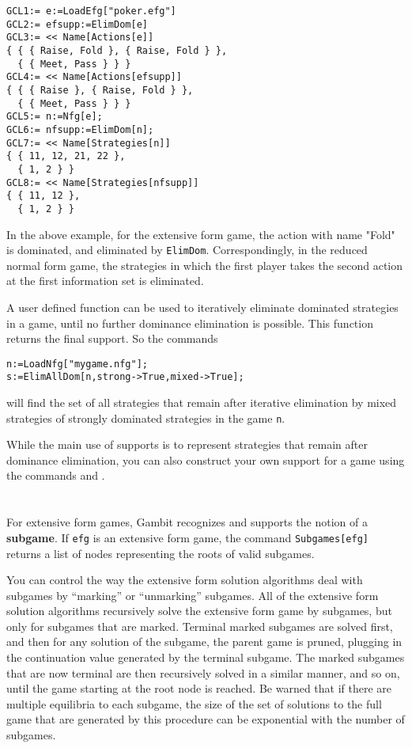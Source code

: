 \begin{verbatim}
GCL1:= e:=LoadEfg["poker.efg"]
GCL2:= efsupp:=ElimDom[e]
GCL3:= << Name[Actions[e]]
{ { { Raise, Fold }, { Raise, Fold } },
  { { Meet, Pass } } }
GCL4:= << Name[Actions[efsupp]]
{ { { Raise }, { Raise, Fold } },
  { { Meet, Pass } } }
GCL5:= n:=Nfg[e];
GCL6:= nfsupp:=ElimDom[n];
GCL7:= << Name[Strategies[n]]
{ { 11, 12, 21, 22 },
  { 1, 2 } }
GCL8:= << Name[Strategies[nfsupp]]
{ { 11, 12 },
  { 1, 2 } }
\end{verbatim}

In the above example, for the extensive form game, the action with
name "Fold" is dominated, and eliminated by \verb+ElimDom+.
Correspondingly, in the reduced normal form game, the strategies in
which the first player takes the second action at the first
information set is eliminated.  

A user defined function  can be used to iteratively
eliminate dominated strategies in a game, until no further dominance
elimination is possible.  This function returns the final support.  So
the commands

\begin{verbatim}
n:=LoadNfg["mygame.nfg"];
s:=ElimAllDom[n,strong->True,mixed->True];
\end{verbatim}

\noindent
will find the set of all strategies that remain after iterative
elimination by mixed strategies of strongly dominated strategies in
the game \verb+n+.

While the main use of supports is to represent strategies that
remain after dominance elimination, you can also construct your own
support for a game using the commands  and
.

\section{}

For extensive form games, Gambit recognizes and supports the notion of
a {\bf subgame}.  If \verb+efg+ is an extensive form game, the
command \verb+Subgames[efg]+ returns a list of nodes
representing the roots of valid subgames.

You can control the way the extensive form solution algorithms deal
with subgames by ``marking'' or ``unmarking'' subgames.  All of the
extensive form solution algorithms recursively solve the extensive
form game by subgames, but only for subgames that are marked.  Terminal
marked subgames are solved first, and then for any solution of the
subgame, the parent game is pruned, plugging in the continuation value
generated by the terminal subgame.  The marked subgames that are now
terminal are then recursively solved in a similar manner, and so on,
until the game starting at the root node is reached.  Be warned that
if there are multiple equilibria to each subgame, the size of the set
of solutions to the full game that are generated by this procedure can
be exponential with the number of subgames.

